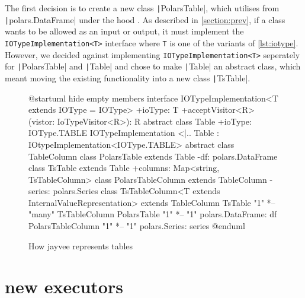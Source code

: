 The first decision is to create a new class \texttt|PolarsTable|, which utilises from \texttt|polars.DataFrame| under the hood %
.
As described in \ref{section:prev}, if a class wants to be allowed as an input or output, it must implement the \texttt{IOTypeImplementation<T>} interface where \texttt{T} is one of the variants of \ref{lst:iotype}.
However, we decided against implementing \texttt{IOTypeImplementation<T>} seperately for \texttt|PolarsTable| and \texttt|Table| and chose to make \texttt|Table| an abstract class, which meant moving the existing functionality into a new class \texttt|TsTable|.
\begin{figure}
	\begin{plantuml}
		@startuml
		hide empty members
		interface IOTypeImplementation<T extends IOType = IOType> {
				+ioType: T
				+acceptVisitor<R>(vistor: IoTypeVisitor<R>): R
			}
		abstract class Table {
				+ioType: IOType.TABLE
			}
		IOTypeImplementation <|.. Table : IOtypeImplementation<IOType.TABLE>
		abstract class TableColumn {
			}
		class PolarsTable extends Table {
				-df: polars.DataFrame
			}
		class TsTable extends Table {
				+columns: Map<string, TsTableColumn>
			}
		class PolarsTableColumn extends TableColumn {
				-series: polars.Series
			}
		class TsTableColumn<T extends InternalValueRepresentation> extends TableColumn {
			}
		TsTable "1" *-- "many" TsTableColumn
		PolarsTable "1" *-- "1" polars.DataFrame: df
		PolarsTableColumn "1" *-- "1" polars.Series: series
		@enduml
	\end{plantuml}
	\caption{How jayvee represents tables} %
	\label{fig:current_sit}
\end{figure}

\section{new executors}
